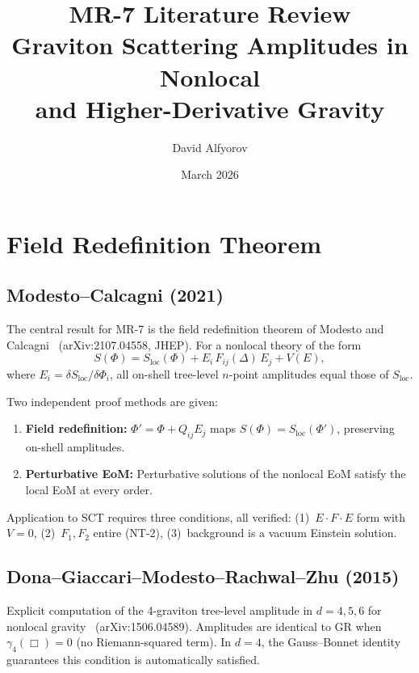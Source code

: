 \documentclass[11pt,a4paper]{article}
\title{\textbf{MR-7 Literature Review}\\[8pt]
  \large Graviton Scattering Amplitudes in Nonlocal\\
  and Higher-Derivative Gravity}
\author{David Alfyorov}
\date{March 2026}
\theoremstyle{remark}
\begin{document}
\maketitle

\tableofcontents

\section{Field Redefinition Theorem}

\subsection{Modesto--Calcagni (2021)}

The central result for MR-7 is the field redefinition theorem of
Modesto and Calcagni~\cite{ModestoCalcagni2021}
(arXiv:2107.04558, JHEP). For a nonlocal theory of the form
\begin{equation}
  S(\Phi) = S_{\mathrm{loc}}(\Phi) + E_i\, F_{ij}(\Delta)\, E_j + V(E),
\end{equation}
where $E_i = \delta S_{\mathrm{loc}}/\delta\Phi_i$, all on-shell
tree-level $n$-point amplitudes equal those of $S_{\mathrm{loc}}$.

Two independent proof methods are given:
\begin{enumerate}
  \item \textbf{Field redefinition:} $\Phi' = \Phi + Q_{ij} E_j$ maps
        $S(\Phi) = S_{\mathrm{loc}}(\Phi')$, preserving on-shell amplitudes.
  \item \textbf{Perturbative EoM:} Perturbative solutions of the nonlocal
        EoM satisfy the local EoM at every order.
\end{enumerate}

Application to SCT requires three conditions, all verified:
(1)~$E \cdot F \cdot E$ form with $V = 0$,
(2)~$F_1, F_2$ entire (NT-2),
(3)~background is a vacuum Einstein solution.

\subsection{Dona--Giaccari--Modesto--Rachwal--Zhu (2015)}

Explicit computation of the 4-graviton tree-level amplitude in
$d = 4, 5, 6$ for nonlocal gravity~\cite{DonaGiaccari2015}
(arXiv:1506.04589). Amplitudes are identical to GR when
$\gamma_4(\Box) = 0$ (no Riemann-squared term). In $d=4$, the
Gauss--Bonnet identity guarantees this condition is automatically
satisfied.
\end{document}
